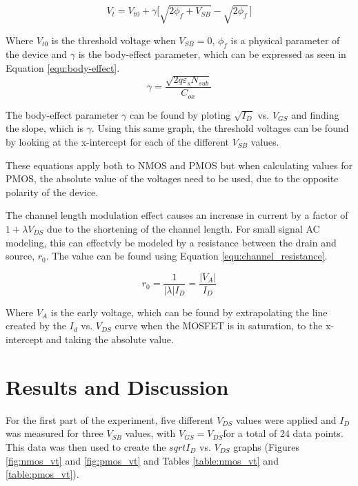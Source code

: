 \documentclass[11pt]{article}
\begin{document}
	\begin{equation}
		\label{equ:vt}
		V_t = V_{t0} + \gamma \Big[\sqrt{2\phi_f+V_{SB}} - \sqrt{2\phi_f} \,\Big]
	\end{equation}

	Where \(V_{t0}\) is the threshold voltage when \(V_{SB} = 0\), \(\phi_f\) is a
	physical parameter of the device and \(\gamma\) is the body-effect parameter,
	which can be expressed as seen in Equation \ref{equ:body-effect}.\\

	\begin{equation}
		\label{equ:body-effect}
		\gamma = \frac{\sqrt{2q\varepsilon_sN_{sub}}}{C_{ox}}
	\end{equation}

	The body-effect parameter \(\gamma\) can be found by ploting 
	\(\sqrt{I_D}\) vs. \(V_{GS}\) and finding the slope, which is \(\gamma\).
	Using this same graph, the threshold voltages can be found by looking
	at the x-intercept for each of the different \(V_{SB}\) values.\\

	\hfill \break
	
	These equations apply both to NMOS and PMOS but when calculating values for
	PMOS, the absolute value of the voltages need to be used, due to the opposite 
	polarity of the device.\\

	\hfill\break

	The channel length modulation effect causes an increase in current
	by a factor of \(1 + \lambda V_{DS}\) due to the shortening of the 
	channel length. For small signal AC modeling, this can effectvly be
	modeled by a resistance between the drain and source, \(r_0\). The 
	value can be found using Equation \ref{equ:channel_resistance}.

	\begin{equation}
		\label{equ:channel_resistance}
		r_0 = \frac{1}{|\lambda|I_D} = \frac{|V_A|}{I_D}
	\end{equation}
	
	Where \(V_A\) is the early voltage, which can be found by extrapolating
the line created by the \(I_d\) vs. \(V_{DS}\) curve when the MOSFET is in
	saturation, to the x-intercept and taking the absolute value. 

	\section{Results and Discussion}
	For the first part of the experiment, five different \(V_{DS}\) values were
	applied and \(I_D\) was measured for three \(V_{SB}\) values, with 
	\(V_{GS} = V_{DS}\)for a total of 24 data points. This data was then used 
	to create the \(sqrt{I_D}\) vs. \(V_{DS}\) graphs (Figures \ref{fig:nmos_vt}
	and \ref{fig:pmos_vt} and Tables \ref{table:nmos_vt} and \ref{table:pmos_vt}). 
	
\end{document}
